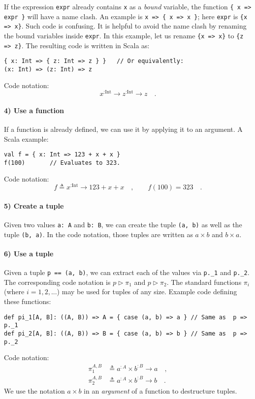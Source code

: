 If the expression \lstinline!expr! already contains \lstinline!x!
as a \emph{bound} variable, the function \lstinline!{ x => expr }!
will have a name clash. An example is \lstinline!x => { x => x }!;
here \lstinline!expr! is \lstinline!{x => x}!. Such code is confusing.
It is helpful to avoid the name clash by renaming the bound variables
inside \lstinline!expr!. In this example, let us rename \lstinline!{x => x}!
to \lstinline!{z => z}!. The resulting code is written in Scala as:
\begin{lstlisting}
{ x: Int => { z: Int => z } }   // Or equivalently:
(x: Int) => (z: Int) => z
\end{lstlisting}
Code notation:
\[
x^{:\text{Int}}\rightarrow z^{:\text{Int}}\rightarrow z\quad.
\]


\paragraph{4) Use a function}

If a function is already defined, we can use it by applying it to
an argument. A Scala example:
\begin{lstlisting}
val f = { x: Int => 123 + x + x }
f(100)       // Evaluates to 323.
\end{lstlisting}
Code notation:
\[
f\triangleq x^{:\text{Int}}\rightarrow123+x+x\quad,\quad\quad f(100)=323\quad.
\]


\paragraph{5) Create a tuple}

Given two values \lstinline!a: A! and \lstinline!b: B!, we can create
the tuple \lstinline!(a, b)! as well as the tuple \lstinline!(b, a)!.
In the code notation, those tuples are written as $a\times b$ and
$b\times a$.

\paragraph{6) Use a tuple}

Given a tuple \lstinline!p == (a, b)!, we can extract each of the
values via \lstinline!p._1! and \lstinline!p._2!. The corresponding
code notation is $p\triangleright\pi_{1}$ and $p\triangleright\pi_{2}$.
The standard functions $\pi_{i}$ (where $i=1,2,...$) may be used
for tuples of any size. Example code defining these functions:
\begin{lstlisting}
def pi_1[A, B]: ((A, B)) => A = { case (a, b) => a } // Same as  p => p._1
def pi_2[A, B]: ((A, B)) => B = { case (a, b) => b } // Same as  p => p._2
\end{lstlisting}
Code notation:
\begin{align*}
\pi_{1}^{A,B} & \triangleq a^{:A}\times b^{:B}\rightarrow a\quad,\\
\pi_{2}^{A,B} & \triangleq a^{:A}\times b^{:B}\rightarrow b\quad.
\end{align*}
We use the notation $a\times b$ in an \emph{argument} of a function
to destructure tuples.

